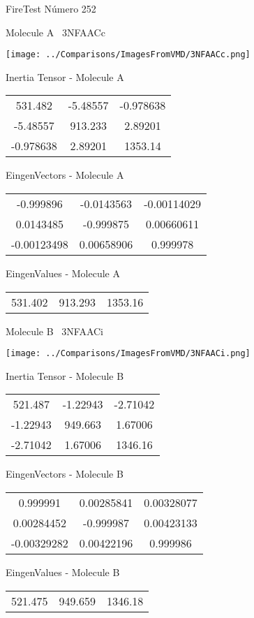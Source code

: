 \vtab[-3cm]
\begin{center}
{\large FireTest \tab Número 252}
\end{center}
\begin{multicols}{2}
\begin{center}

Molecule A \
3NFAACc

\texttt{[image: ../Comparisons/ImagesFromVMD/3NFAACc.png]}

Inertia Tensor - Molecule A \\
\begin{tabular}{|c c c|}
531.482	 & 	-5.48557	 & 	-0.978638	 \\
-5.48557	 & 	913.233	 & 	2.89201	 \\
-0.978638	 & 	2.89201	 & 	1353.14
\end{tabular}

\vtab
 EingenVectors - Molecule A     \\
\begin{tabular}{|c c c|}
-0.999896	 & 	-0.0143563	 & 	-0.00114029	 \\
0.0143485	 & 	-0.999875	 & 	0.00660611	 \\
-0.00123498	 & 	0.00658906	 & 	0.999978
\end{tabular}

\vtab
 EingenValues - Molecule A     \\
\begin{tabular}{|c c c|}
531.402	 & 	913.293	 & 	1353.16	 \\
\end{tabular}
\columnbreak

Molecule B \
3NFAACi

\texttt{[image: ../Comparisons/ImagesFromVMD/3NFAACi.png]}

Inertia Tensor - Molecule B \\
\begin{tabular}{|c c c|}
521.487	 & 	-1.22943	 & 	-2.71042	 \\
-1.22943	 & 	949.663	 & 	1.67006	 \\
-2.71042	 & 	1.67006	 & 	1346.16
\end{tabular}

\vtab
 EingenVectors - Molecule B     \\
\begin{tabular}{|c c c|}
0.999991	 & 	0.00285841	 & 	0.00328077	 \\
0.00284452	 & 	-0.999987	 & 	0.00423133	 \\
-0.00329282	 & 	0.00422196	 & 	0.999986
\end{tabular}

\vtab
 EingenValues - Molecule B     \\
\begin{tabular}{|c c c|}
521.475	 & 	949.659	 & 	1346.18	 \\
\end{tabular}

\end{center}
\end{multicols}

